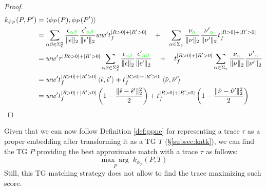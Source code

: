 \begin{proof}
$$\begin{aligned}
k_{\phi_{\mathcal{P}}}(P,P')&=\Braket{\phi_{\mathcal{P}}(P),\phi_{\mathcal{P}}(P')}\\
	&=\sum_{\alpha\beta\in \Sigma_\varepsilon^2}\frac{\epsilon_{\color{green}\alpha\beta}}{\|\epsilon\|_2}\frac{{\epsilon'}_{\color{green}\alpha\beta}}{\|\epsilon'\|_2}ww't_f^{|R>0|+|R'>0|}\quad+\quad \sum_{\alpha\in \Sigma_\varepsilon}\frac{\nu_{\color{green}\alpha}}{\|\nu\|_2}\frac{{\nu'}_{\color{green}\alpha}}{\|\nu'\|_2}t_f^{|R>0|+|R'>0|}\\
	&=ww'\tau^{|Rb>0|+|R'>0|}\sum_{\alpha\beta\in \Sigma_\varepsilon^2}\frac{\epsilon_{\color{green}\alpha\beta}}{\|\epsilon\|_2}\frac{{\epsilon'}_{\color{green}\alpha\beta}}{\|\epsilon'\|_2}\quad+\quad t_f^{|R>0|+|R'>0|}\sum_{\alpha\in \Sigma_\varepsilon}\frac{\nu_{\color{green}\alpha}}{\|\nu\|_2}\frac{{\nu'}_{\color{green}\alpha}}{\|\nu'\|_2}\\
	&=ww't_f^{|R>0|+|R'>0|}\Braket{\hat{\epsilon}, \hat{\epsilon}'}+ t_f^{|R>0|+|R'>0|}\Braket{\hat{\nu}, \hat{\nu}'}\\
	&=ww't_f^{|R>0|+|R'>0|}\left(1-\frac{\|\hat{\epsilon}- \hat{\epsilon}'\|_{2}^2}{2}\right)+ t_f^{|R>0|+|R'>0|}\left(1-\frac{\|\hat{\nu}- \hat{\nu}'\|_{2}^2}{2}\right)\\
\end{aligned}$$
\end{proof}

Given that we can now follow Definition \ref{def:ppne} for representing a trace $\tau$ as a proper embedding after transforming it as a TG $T$ (\S\ref{subsec:katk}), we can find the TG $P$ providing the best approximate match with  a trace $\tau$ as follows:
\[\underset{{P}}{\max\arg}\;k_{\phi_{\mathcal{P}}}(P,T)\]
Still, this TG matching strategy does not allow to find the trace maximizing such score. %

